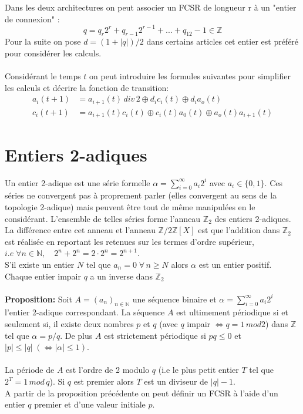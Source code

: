 \documentclass[11pt]{report}
\begin{document}
	Dans les deux architectures on peut associer un FCSR de longueur r à un "entier de connexion" : 
	$$
	q = q_r2^r + q_{r-1}2^{r-1} + ... + q_12 - 1 \in 
	\mathbb{Z}
	$$
	Pour la suite on pose $d = (1+|q|)/2$ dans certains articles cet entier est préféré pour considérer les calculs.
	\\\\
	Considérant le temps $t$ on peut introduire les formules suivantes pour simplifier les calculs et décrire la fonction de transition: 
	\begin{align*}
		a_i(t+1) &= a_{i+1}(t) \, div \, 2 \oplus d_ic_i(t) \oplus d_ia_o(t)\\
		c_i(t+1) &= a_{i+1}(t)c_i(t) \oplus c_i(t)a_0(t) \oplus a_o(t)a_{i+1}(t)
	\end{align*}
		
	
	\section{Entiers 2-adiques}
	
	Un entier 2-adique est une série formelle $\alpha = \sum_{i=0}^\infty a_i2^i$ avec $a_i \in \{0,1\}$.
	Ces séries ne convergent pas à proprement parler (elles convergent au sens de la topologie 2-adique) mais peuvent être tout de même manipulées en le considérant. L'ensemble de telles séries forme l'anneau $\mathbb{Z}_2$ des entiers 2-adiques. La différence entre cet anneau et l'anneau $\mathbb{Z}/2\mathbb{Z}[X]$ est que l'addition dans $\mathbb{Z}_2$ est réalisée en reportant les retenues sur les termes d'ordre supérieur, $i.e\;\forall n \in \mathbb{N},\quad 2^n+2^n = 2 \cdot 2^n = 2^{n+1}$.
	\\
	S'il existe un entier $N$ tel que $a_n=0 \; \forall \, n \geq N$ alors $\alpha$ est un entier positif. Chaque entier impair $q$ a un inverse dans $\mathbb{Z}_2$
	\\
	\\
	\textbf{Proposition:} Soit $A=(a_n)_{n \in \mathbb{N}}$ une séquence binaire et $\alpha = \sum_{i=0}^\infty a_i2^i$ l'entier 2-adique correspondant. La séquence $A$ est ultimement périodique si et seulement si, il existe deux nombres $p$ et $q$ (avec $q$ impair $\iff q=1\,mod2$)  dans $\mathbb{Z}$ tel que $\alpha = p/q$. De plus $A$ est strictement périodique si $pq \leq 0$ et $|p| \leq |q| \;(\iff |\alpha| \leq 1)$.
	\\
	\\
	La période de $A$ est l'ordre de 2 modulo $q$ (i.e le plus petit entier $T$ tel que $2^T = 1\,mod \,q$). Si $q$ est premier alors $T$ est un diviseur de $|q| - 1$. 
	\\
	A partir de la proposition précédente on peut définir un FCSR à l'aide d'un entier $q$ premier et d'une valeur initiale $p$.
	
\end{document}
